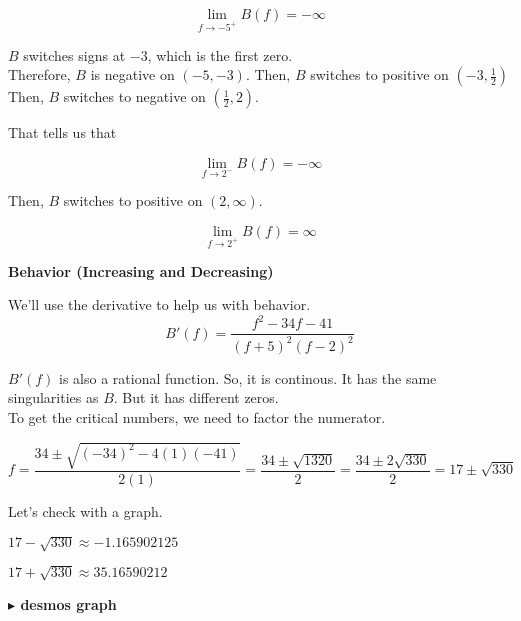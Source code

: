 \documentclass{ximera}
\begin{document}
\begin{example}
\begin{explanation}
\[
\lim\limits_{f \to -5^+} B(f) = -\infty 
\]



$B$ switches signs at $-3$, which is the first zero. \\


Therefore, $B$ is negative on $(-5, -3)$.  Then, $B$ switches to positive on $\left( -3, \frac{1}{2} \right)$ Then, $B$ switches to negative on $\left( \frac{1}{2}, 2 \right)$.


That tells us that 

\[
\lim\limits_{f \to 2^-} B(f) = -\infty 
\]


Then, $B$ switches to positive on $(2, \infty)$.


\[
\lim\limits_{f \to 2^+} B(f) = \infty 
\]


\end{explanation}
















\textbf{Behavior (Increasing and Decreasing)}


We'll use the derivative to help us with behavior. \\


\[
B'(f) = \frac{f^2 - 34f - 41}{(f+5)^2(f-2)^2}
\]


$B'(f)$ is also a rational function.  So, it is continous.  It has the same singularities as $B$.  But it has different zeros. \\


To get the critical numbers, we need to factor the numerator.


\[
f = \frac{34 \pm \sqrt{(-34)^2 - 4 (1)(-41)}}{2(1)} = \frac{34 \pm \sqrt{1320}}{2} = \frac{34 \pm 2\sqrt{330}}{2} = 17 \pm \sqrt{330}
\]




Let's check with a graph.

$17 - \sqrt{330} \approx -1.165902125$

$17 + \sqrt{330} \approx 35.16590212$







\textbf{\textcolor{blue!55!black}{$\blacktriangleright$ desmos graph}} 
\begin{center}
\end{center}






\end{example}
\end{document}

